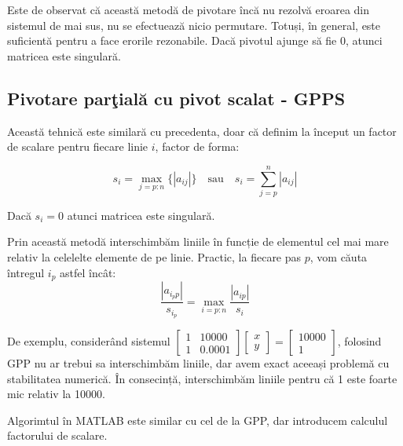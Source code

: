 \documentclass{exam}
\begin{document}
Este de observat că această metodă de pivotare încă nu rezolvă eroarea din
sistemul de mai sus, nu se efectuează nicio permutare. Totuși, în general, este
suficientă pentru a face erorile rezonabile. Dacă pivotul ajunge să fie 0,
atunci matricea este singulară.

\subsection{Pivotare parţială cu pivot scalat - GPPS}

Această tehnică este similară cu precedenta, doar că definim la început un
factor de scalare pentru fiecare linie $i$, factor de forma:

\begin{equation*}
	s_i = \max_{j=p:n}{\{|a_{ij}|\}} \quad \text{sau} \quad s_i = \sum_{j=p}^{n}{|a_{ij}|}
\end{equation*}

Dacă $s_i = 0$ atunci matricea este singulară.

Prin această metodă interschimbăm liniile în funcție de elementul cel mai
mare relativ la celelelte elemente de pe linie. Practic, la fiecare pas $p$,
vom căuta întregul $i_p$ astfel încât:
\begin{equation*}
	\frac{|a_{i_p p}|}{s_{i_p}} = \max_{i=p:n}{\frac{|a_{i p}|}{s_i}}
\end{equation*}

De exemplu, considerând sistemul
$\begin{bmatrix}
		1 & 10000  \\
		1 & 0.0001
	\end{bmatrix}
	\begin{bmatrix}
		x \\
		y
	\end{bmatrix}
	=
	\begin{bmatrix}
		10000 \\
		1
	\end{bmatrix}
$, folosind GPP nu ar trebui sa interschimbăm liniile, dar avem exact aceeași
problemă cu stabilitatea numerică. În consecință, interschimbăm liniile pentru
că 1 este foarte mic relativ la 10000.

Algorimtul în MATLAB este similar cu cel de la GPP, dar introducem
calculul factorului de scalare.
\end{document}
